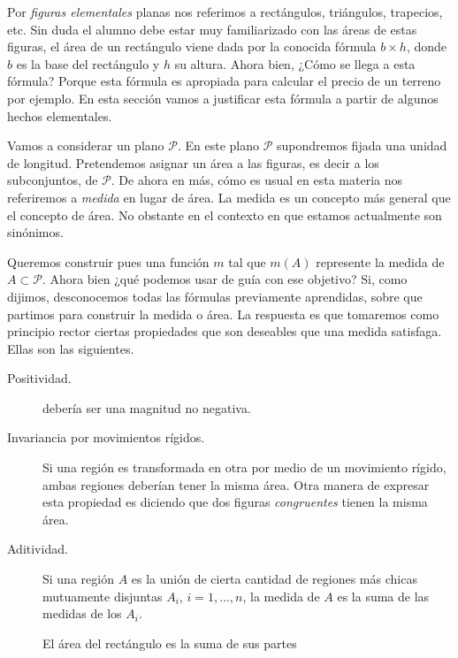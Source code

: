  


Por \emph{figuras elementales} planas nos referimos a rectángulos, triángulos, trapecios, etc. Sin duda el alumno  debe estar  muy familiarizado con las áreas de estas figuras, el área de un rectángulo viene dada por la conocida fórmula $b\times h$, donde $b$ es la base del rectángulo y $h$ su altura.  Ahora bien, ¿Cómo 
se llega a esta fórmula? Porque esta fórmula es apropiada para calcular el precio de un terreno por ejemplo. En esta sección vamos a justificar esta fórmula a partir de algunos hechos elementales.



Vamos a considerar un plano $\mathcal{P}$. En este plano $\mathcal{P}$ supondremos fijada una unidad de longitud.  Pretendemos asignar un área a las figuras, es decir a los subconjuntos, de $\mathcal{P}$. De ahora en más, cómo es usual en esta materia  nos referiremos a \emph{medida} en lugar de área. La medida es un concepto más general  que el concepto de área. No obstante en el contexto en que estamos actualmente son sinónimos.  

Queremos construir pues una función $m$ tal que $m(A)$ represente la medida  de  $A\subset\mathcal{P}$. Ahora bien ¿qué podemos usar de guía con ese objetivo? Si, como dijimos,  desconocemos todas las fórmulas previamente aprendidas, sobre que partimos para construir la medida o área. La respuesta es que tomaremos como principio rector  ciertas propiedades que son deseables  que una medida satisfaga. Ellas son las  siguientes. 




\begin{description}
 \item[Positividad.] debería ser una magnitud no negativa.  
 \item[Invariancia por movimientos rígidos.] Si una región es transformada en otra por medio de un movimiento rígido, ambas regiones deberían tener la misma área. Otra manera de expresar esta propiedad es diciendo que dos figuras \emph{congruentes} tienen la misma área. 
 \item[Aditividad.] Si una región $A$ es la unión de cierta cantidad de regiones más chicas mutuamente disjuntas $A_i$, $i=1,\ldots,n$, la medida   de $A$ es la suma de las medidas de los $A_i$.
\end{description}

\begin{figure}[h]
\begin{center}
 
 \caption{El área del rectángulo es la suma de sus partes}\label{fig:rect_descop} 
\end{center}
\end{figure}

